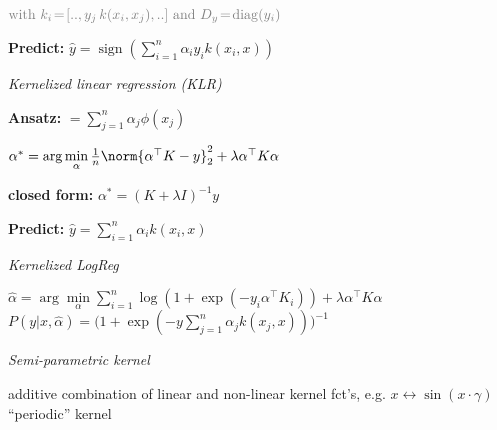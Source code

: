 $\color{gray} \text{with } k_i\!=\![.., y_j\,k(x_i,x_j), ..] \text{ and } D_y\!=\!\operatorname{diag}(y_i)$

\textbf{Predict:} $\hat y = \operatorname{sign}(\sum_{i=1}^n \alpha_iy_ik(x_i, x))$

\emph{Kernelized linear regression (KLR)}

\textbf{Ansatz:}  $= \sum_{j=1}^n \alpha_j\phi(x_j)$

$\alpha^\ast =
\arg\min\limits_\alpha \frac{1}{n} \norm{\alpha^\top K-y}_2^2 + \lambda\alpha^\top K\alpha$
\vspace{-1pt}

\textbf{closed form:} $\alpha^\ast = (K+\lambda I)^{-1}y$

\textbf{Predict:} $\hat y = \sum_{i=1}^n \alpha_i k(x_i,x)$

\emph{Kernelized LogReg}

$\hat\alpha \!=\! \arg\!\min\limits_\alpha \sum_{i=1}^n \log(1\!+\!\exp(-y_i\alpha^\top\! K_i)) \!+\! \lambda\alpha^\top\! K\alpha$\vspace{-3pt}\\
$P(y\vert x,\hat\alpha) = \big( 1+\exp(-y\sum_{j=1}^n\alpha_j k(x_j,x)) \big)^{-1}$

\emph{Semi-parametric kernel}

additive combination of linear and non-linear kernel fct's, e.g. $x\leftrightarrow \sin(x\!\cdot\!\gamma)$ {\small\color{gray} ``periodic'' kernel}
